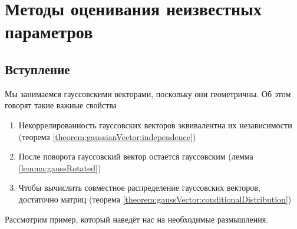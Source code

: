 \chapter{Методы оценивания неизвестных параметров}

\section{Вступление}

Мы занимаемся гауссовскими векторами, поскольку они геометричны. Об этом говорят
такие важные свойства
\begin{enumerate}
    \item Некоррелированность гауссовских векторов эквивалентна их независимости
        (теорема \ref{theorem:gaussianVector:independence})
    \item После поворота гауссовский вектор остаётся гауссовским
        (лемма \ref{lemma:gaussRotated})
    \item Чтобы вычислить совместное распределение гауссовских векторов,
        достаточно матриц
        (теорема \ref{theorem:gaussVector:conditionalDistribution})
\end{enumerate}

Рассмотрим пример, который наведёт нас на необходимые размышления.

